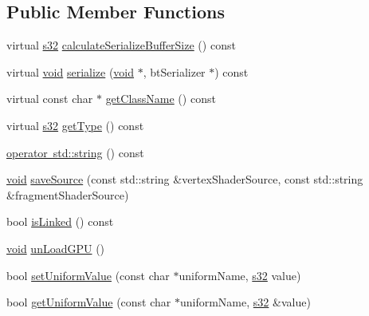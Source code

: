 \subsection*{Public Member Functions}
\begin{DoxyCompactItemize}
\item 
virtual \mbox{\hyperlink{_util_8h_aa62c75d314a0d1f37f79c4b73b2292e2}{s32}} \mbox{\hyperlink{classnjli_1_1_shader_program_ae6b8ee664db016d247d1969a80a4d0f0}{calculate\+Serialize\+Buffer\+Size}} () const
\item 
virtual \mbox{\hyperlink{_thread_8h_af1e856da2e658414cb2456cb6f7ebc66}{void}} \mbox{\hyperlink{classnjli_1_1_shader_program_afe83d2e58961011b642a25e7c15a6953}{serialize}} (\mbox{\hyperlink{_thread_8h_af1e856da2e658414cb2456cb6f7ebc66}{void}} $\ast$, bt\+Serializer $\ast$) const
\item 
virtual const char $\ast$ \mbox{\hyperlink{classnjli_1_1_shader_program_a61698287de4dadfd88151f40038569cf}{get\+Class\+Name}} () const
\item 
virtual \mbox{\hyperlink{_util_8h_aa62c75d314a0d1f37f79c4b73b2292e2}{s32}} \mbox{\hyperlink{classnjli_1_1_shader_program_af2f154eef9904f4b5078983ae025cd7a}{get\+Type}} () const
\item 
\mbox{\hyperlink{classnjli_1_1_shader_program_a2af9c6b24ed749e698c3fce3fabda18f}{operator std\+::string}} () const
\item 
\mbox{\hyperlink{_thread_8h_af1e856da2e658414cb2456cb6f7ebc66}{void}} \mbox{\hyperlink{classnjli_1_1_shader_program_a302cf231b252535230e1eaa794c0dc3e}{save\+Source}} (const std\+::string \&vertex\+Shader\+Source, const std\+::string \&fragment\+Shader\+Source)
\item 
bool \mbox{\hyperlink{classnjli_1_1_shader_program_a232cb84b51bfdd0d3ace500fedde45a2}{is\+Linked}} () const
\item 
\mbox{\hyperlink{_thread_8h_af1e856da2e658414cb2456cb6f7ebc66}{void}} \mbox{\hyperlink{classnjli_1_1_shader_program_af93d37d88d0d56ae1dfe0a902ec7391e}{un\+Load\+G\+PU}} ()
\item 
bool \mbox{\hyperlink{classnjli_1_1_shader_program_aa48f0968f86931295b686cb31d6aadfd}{set\+Uniform\+Value}} (const char $\ast$uniform\+Name, \mbox{\hyperlink{_util_8h_aa62c75d314a0d1f37f79c4b73b2292e2}{s32}} value)
\item 
bool \mbox{\hyperlink{classnjli_1_1_shader_program_a01aeae9437f32732e8d2d3b59c962139}{get\+Uniform\+Value}} (const char $\ast$uniform\+Name, \mbox{\hyperlink{_util_8h_aa62c75d314a0d1f37f79c4b73b2292e2}{s32}} \&value)

\end{DoxyCompactItemize}
